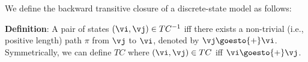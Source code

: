 \vfill
We define the backward transitive closure 
of a discrete-state model as follows:

\textbf{Definition}: A pair of states $(\vi, \vj) \in TC^{-1}$ iff there exists a non-trivial
(i.e., positive length) path $\pi$ from $\vj$ to $\vi$, denoted by
$\vj \goesto{+} \vi$. Symmetrically, we can define $TC$ where $(\vi, \vj) \in
TC$ iff $\vi \goesto{+} \vj$.

\vfill 
{}
\vfill 
{}
\vfill

